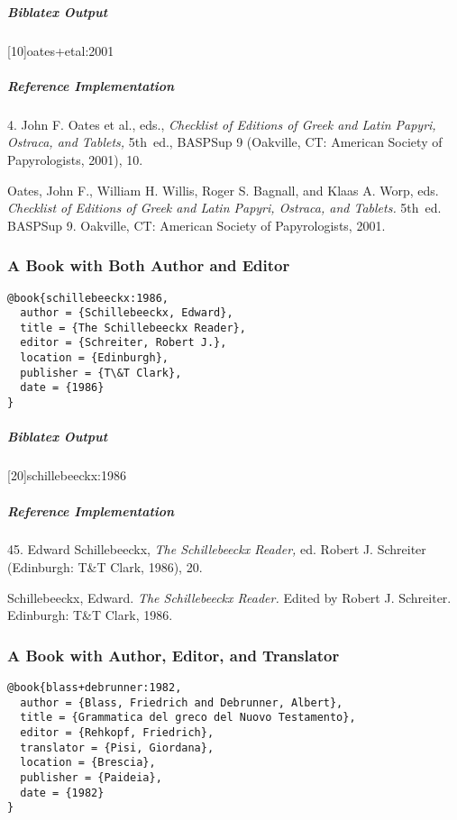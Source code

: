 \documentclass[a4paper]{article}
\newenvironment{biboutput}{%
  \subparagraph{Biblatex Output}
}{\color{black}}
\newenvironment{refimp}{%
  \subparagraph{Reference Implementation}
  \color{reference-colour}
  \rm
}{\par\color{black}}
\begin{document}
\begin{biboutput}
  [10]{oates+etal:2001}
\end{biboutput}

\begin{refimp}
  4. John F. Oates et al., eds., \emph{Checklist of Editions of Greek and Latin
  Papyri, Ostraca, and Tablets,} 5th~ed., BASPSup 9 (Oakville, CT: American
  Society of Papyrologists, 2001), 10.

  \hangindent\bibindent Oates, John F., William H. Willis, Roger S. Bagnall,
  and Klaas A. Worp, eds. \emph{Checklist of Editions of Greek and Latin
  Papyri, Ostraca, and Tablets.} 5th~ed. BASPSup 9. Oakville, CT: American
  Society of Papyrologists, 2001.

\end{refimp}

\subsubsection{A Book with Both Author and Editor}

\begin{lstlisting}
@book{schillebeeckx:1986,
  author = {Schillebeeckx, Edward},
  title = {The Schillebeeckx Reader},
  editor = {Schreiter, Robert J.},
  location = {Edinburgh},
  publisher = {T\&T Clark},
  date = {1986}
}
\end{lstlisting}  

\begin{biboutput}
  [20]{schillebeeckx:1986}
\end{biboutput}

\begin{refimp}
  45. Edward Schillebeeckx, \emph{The Schillebeeckx Reader,} ed. Robert J.
  Schreiter (Edinburgh: T\&T Clark, 1986), 20.

  \hangindent\bibindent Schillebeeckx, Edward. \emph{The Schillebeeckx
  Reader.} Edited by Robert J. Schreiter. Edinburgh: T\&T Clark, 1986.
\end{refimp}

\subsubsection{A Book with Author, Editor, and Translator}

\begin{lstlisting}
@book{blass+debrunner:1982,
  author = {Blass, Friedrich and Debrunner, Albert},
  title = {Grammatica del greco del Nuovo Testamento},
  editor = {Rehkopf, Friedrich},
  translator = {Pisi, Giordana},
  location = {Brescia},
  publisher = {Paideia},
  date = {1982}
}
\end{lstlisting}  
\end{document}
